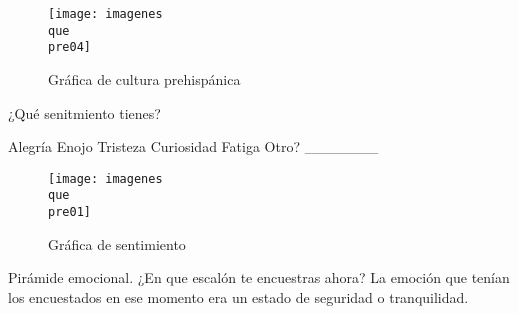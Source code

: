 \begin{questions}
\begin{figure}
	\centering
	\caption{Gráfica de cultura prehispánica}
	\label{fig:pre04}
	\texttt{[image: imagenes\\que\\pre04]}
\end{figure}

	
	\question ¿Qué senitmiento tienes? 
	\begin{checkboxes}
		\choice Alegría
		\choice Enojo
		\choice Tristeza
		\choice Curiosidad
		\choice Fatiga
		\choice Otro? _______
	\end{checkboxes}

\begin{figure}
	\centering
	\caption{Gráfica de sentimiento}
	\label{fig:pre05}
	\texttt{[image: imagenes\\que\\pre01]}
\end{figure}

	
	\question Pirámide emocional. ¿En que escalón te encuestras ahora?
	La emoción que tenían los encuestados en ese momento era un estado de seguridad o tranquilidad.
	
	
\end{questions}

